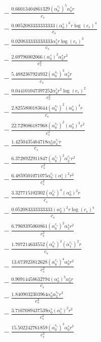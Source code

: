 \documentclass[10pt]{article}
\begin{document}
\begin{align*}
&{}  - \frac{0.66013404861329 \left(\alpha_{0}^{c_s}\right)^{5} \alpha_{0}^s r}{c_{s}} \\
&{}  - \frac{0.0052083333333333 \left(\alpha_{0}^s\right)^{6} r \log{\left(c_{s} \right)}^{4}}{c_{s}} \\
&{}  - \frac{0.020833333333333 \alpha_{5}^s r \log{\left(c_{s} \right)}^{3}}{c_{s}} \\
&{}  - \frac{2.69796002066 \left(\alpha_{0}^s\right)^{2} \alpha_{2}^s r^{2}}{c_{s}^{2}} \\
&{}  - \frac{5.4882367924932 \left(\alpha_{0}^{c_s}\right)^{3} \alpha_{2}^s r}{c_{s}} \\
&{}  - \frac{0.044101047397252 \alpha_{4}^s r^{2} \log{\left(c_{s} \right)}^{2}}{c_{s}^{2}} \\
&{}  - \frac{2.8255800183644 \left(\alpha_{0}^{c_s}\right)^{2} \left(\alpha_{0}^s\right)^{4} r}{c_{s}} \\
&{}  - \frac{22.729086187968 \left(\alpha_{0}^{c_s}\right)^{2} \left(\alpha_{0}^s\right)^{3} r^{2}}{c_{s}^{2}} \\
&{}  - \frac{1.4250435464718 \alpha_{0}^s \alpha_{4}^{c_s} r}{c_{s}} \\
&{}  - \frac{6.3728922911847 \left(\alpha_{0}^{c_s}\right)^{2} \alpha_{2}^{c_s} r^{2}}{c_{s}^{2}} \\
&{}  - \frac{6.4859501071075 \alpha_{0}^{c_s} \left(\alpha_{1}^s\right)^{2} r^{2}}{c_{s}^{2}} \\
&{}  - \frac{3.327715102302 \left(\alpha_{0}^{c_s}\right)^{4} \left(\alpha_{0}^s\right)^{2} r}{c_{s}} \\
&{}  - \frac{0.052083333333333 \left(\alpha_{2}^s\right)^{2} r \log{\left(c_{s} \right)}^{4}}{c_{s}} \\
&{}  - \frac{6.7969395060861 \left(\alpha_{0}^{c_s}\right)^{2} \alpha_{2}^s r^{2}}{c_{s}^{2}} \\
&{}  - \frac{1.707214633552 \left(\alpha_{0}^{c_s}\right)^{2} \left(\alpha_{1}^{c_s}\right)^{2} r}{c_{s}} \\
&{}  - \frac{13.673923812628 \left(\alpha_{0}^{c_s}\right)^{4} \alpha_{0}^s r^{2}}{c_{s}^{2}} \\
&{}  - \frac{0.90914458632794 \left(\alpha_{0}^s\right)^{3} \alpha_{2}^s r}{c_{s}} \\
&{}  - \frac{1.8409032303964 \alpha_{0}^s \alpha_{2}^{c_s} r^{3}}{c_{s}^{3}} \\
&{}  - \frac{3.7167089437539 \alpha_{0}^s \left(\alpha_{1}^s\right)^{2} r^{2}}{c_{s}^{2}} \\
&{}  - \frac{15.502242761859 \left(\alpha_{0}^{c_s}\right)^{3} \alpha_{0}^s r^{3}}{c_{s}^{3}} \\

\end{align*}
\end{document}
